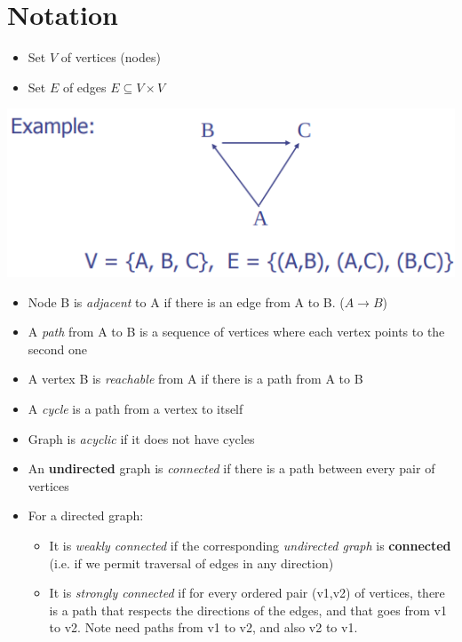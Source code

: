 \documentclass{article}
\begin{document}
\section{Notation}
\begin{itemize}
	\item Set $V$ of vertices (nodes)
	\item Set $E$ of edges $E \subseteq V \times V$
\end{itemize}
\begin{center}
	\includegraphics[scale=0.5]{graph_example_2.png}
\end{center}
\begin{itemize}
	\item Node B is \textit{adjacent} to A if there is an edge from A to B. ($A \rightarrow B$)
	\item A \textit{path} from A to B is a sequence of vertices where each vertex points to the second one 
	\item A vertex B is \textit{reachable} from A if there is a path from A to B
	\item A \textit{cycle} is a path from a vertex to itself
	\item Graph is \textit{acyclic} if it does not have cycles
	\item An \textbf{undirected} graph is \textit{connected} if there is a path between every pair of vertices
	\item For a directed graph:
	\begin{itemize}
		\item It is \textit{weakly connected} if the corresponding \textit{undirected graph} is \textbf{connected} (i.e. if we permit traversal of edges in any direction)
		\item It is \textit{strongly connected} if for every ordered pair (v1,v2) of vertices, there is a path that respects the directions of the edges, and that goes from v1 to v2. Note need paths from v1 to v2, and also v2 to v1.
	\end{itemize}
\end{itemize}
\end{document}
